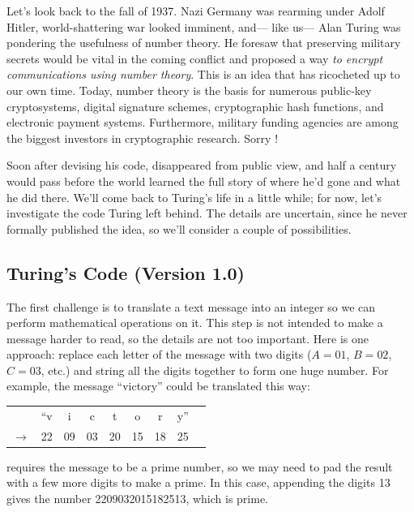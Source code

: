 
Let's look back to the fall of 1937.  Nazi Germany was rearming under
Adolf Hitler, world-shattering war looked imminent, and--- like us---
Alan Turing was pondering the usefulness of number theory.  He foresaw
that preserving military secrets would be vital in the coming conflict
and proposed a way \emph{to encrypt communications using number
theory}.  This is an idea that has ricocheted up to our own time.
Today, number theory is the basis for numerous public-key
cryptosystems, digital signature schemes, cryptographic hash
functions, and electronic payment systems.  Furthermore, military
funding agencies are among the biggest investors in cryptographic
research.  Sorry !

Soon after devising his code,  disappeared from public view,
and half a century would pass before the world learned the full story of
where he'd gone and what he did there.  We'll come back to Turing's life
in a little while; for now, let's investigate the code Turing left behind.
The details are uncertain, since he never formally published the idea, so
we'll consider a couple of possibilities.

\subsection{Turing's Code (Version 1.0)}

The first challenge is to translate a text message into an integer so
we can perform mathematical operations on it.  This step is not
intended to make a message harder to read, so the details are not too
important.  Here is one approach: replace each letter of the message
with two digits ($A = 01$, $B = 02$, $C = 03$, etc.) and string all
the digits together to form one huge number.  For example, the message
``victory'' could be translated this way:
%
\begin{center}
\begin{tabular}{ccccccccc}
   &``v &  i &  c &  t & o & r & y'' \\
$\rightarrow$ & 22 & 09 & 03 & 20 & 15 & 18 & 25
\end{tabular}
\end{center}
%
 requires the message to be a prime number, so we may
need to pad the result with a few more digits to make a prime.  In
this case, appending the digits 13 gives the number 2209032015182513,
which is prime.

